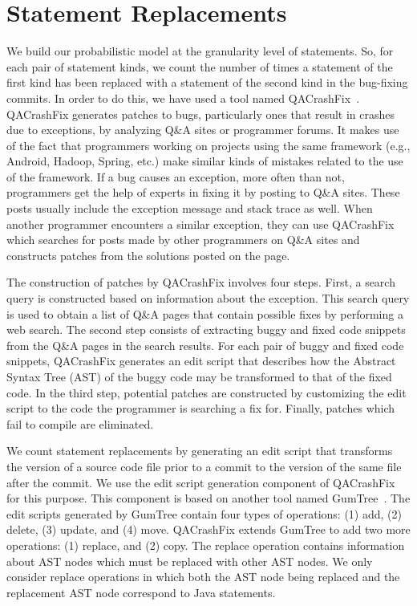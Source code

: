 
\section{Statement Replacements}

We build our probabilistic model at the granularity level of statements.
So, for each pair of statement kinds, we count the number of times a statement of the first kind
has been replaced with a statement of the second kind in the bug-fixing commits. In order to do this, we have used a tool named QACrashFix~\cite{Gao2015}. QACrashFix generates patches to bugs, particularly ones that result in crashes due to exceptions, by analyzing Q\&A sites or programmer forums. It makes use of the fact that programmers working on projects using the same framework (e.g., Android, Hadoop, Spring, etc.) make similar kinds of mistakes related to the use of the framework. If a bug causes an exception, more often than not, programmers get the help of experts in fixing it by posting to Q\&A sites. These posts usually include the exception message and stack trace as well. When another programmer encounters a similar exception, they can use QACrashFix which searches for posts made by other programmers on Q\&A sites and constructs patches from the solutions posted on the page.

The construction of patches by QACrashFix involves four steps. First, a search query is constructed based on information about the exception. This search query is used to obtain a list of Q\&A pages that contain possible fixes by performing a web search. The second step consists of extracting buggy and fixed code snippets from the Q\&A pages in the search results. For each pair of buggy and fixed code snippets, QACrashFix generates an edit script that describes how the Abstract Syntax Tree (AST) of the buggy code may be transformed to that of the fixed code. In the third step, potential patches are constructed by customizing the edit script to the code the programmer is searching a fix for. Finally, patches which fail to compile are eliminated.

We count statement replacements by generating an edit script that transforms the version of a source code file prior to a commit to the version of the same file after the commit. We use the edit script generation component of QACrashFix for this purpose. This component is based on another tool named GumTree~\cite{Falleri2014}. The edit scripts generated by GumTree contain four types of operations: (1) add, (2) delete, (3) update, and (4) move. QACrashFix extends GumTree to add two more operations: (1) replace, and (2) copy. The replace operation contains information about AST nodes which must be replaced with other AST nodes. We only consider replace operations in which both the AST node being replaced and the replacement AST node correspond to Java statements.